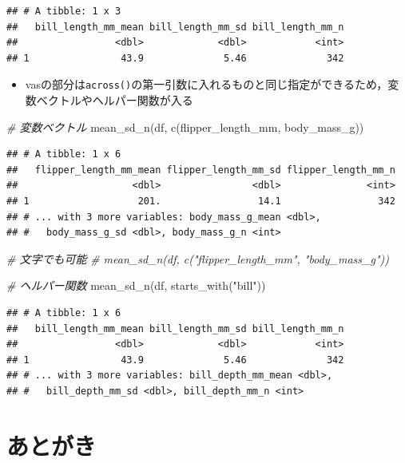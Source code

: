\documentclass[
  xelatex,ja=standard, b5paper]{bxjsbook}
\newenvironment{Shaded}{\begin{snugshade}}{\end{snugshade}}
\newcommand{\CommentTok}[1]{\textcolor[rgb]{0.56,0.35,0.01}{\textit{#1}}}
\newcommand{\FunctionTok}[1]{\textcolor[rgb]{0.00,0.00,0.00}{#1}}
\newcommand{\NormalTok}[1]{#1}
\newcommand{\StringTok}[1]{\textcolor[rgb]{0.31,0.60,0.02}{#1}}
\providecommand{\tightlist}{%
  \setlength{\itemsep}{0pt}\setlength{\parskip}{0pt}}
\begin{document}
\begin{verbatim}
## # A tibble: 1 x 3
##   bill_length_mm_mean bill_length_mm_sd bill_length_mm_n
##                 <dbl>             <dbl>            <int>
## 1                43.9              5.46              342
\end{verbatim}

\begin{itemize}
\tightlist
\item
  vasの部分は\texttt{across()}の第一引数に入れるものと同じ指定ができるため，変数ベクトルやヘルパー関数が入る
\end{itemize}

\begin{Shaded}
\begin{Highlighting}[]
\CommentTok{\# 変数ベクトル}
\FunctionTok{mean\_sd\_n}\NormalTok{(df, }\FunctionTok{c}\NormalTok{(flipper\_length\_mm, body\_mass\_g))}
\end{Highlighting}
\end{Shaded}

\begin{verbatim}
## # A tibble: 1 x 6
##   flipper_length_mm_mean flipper_length_mm_sd flipper_length_mm_n
##                    <dbl>                <dbl>               <int>
## 1                   201.                 14.1                 342
## # ... with 3 more variables: body_mass_g_mean <dbl>,
## #   body_mass_g_sd <dbl>, body_mass_g_n <int>
\end{verbatim}

\begin{Shaded}
\begin{Highlighting}[]
\CommentTok{\# 文字でも可能}
\CommentTok{\# mean\_sd\_n(df, c("flipper\_length\_mm", "body\_mass\_g"))}

\CommentTok{\# ヘルパー関数}
\FunctionTok{mean\_sd\_n}\NormalTok{(df, }\FunctionTok{starts\_with}\NormalTok{(}\StringTok{"bill"}\NormalTok{))}
\end{Highlighting}
\end{Shaded}

\begin{verbatim}
## # A tibble: 1 x 6
##   bill_length_mm_mean bill_length_mm_sd bill_length_mm_n
##                 <dbl>             <dbl>            <int>
## 1                43.9              5.46              342
## # ... with 3 more variables: bill_depth_mm_mean <dbl>,
## #   bill_depth_mm_sd <dbl>, bill_depth_mm_n <int>
\end{verbatim}

\hypertarget{atogaki}{%
\chapter*{あとがき}\label{atogaki}}
\end{document}
